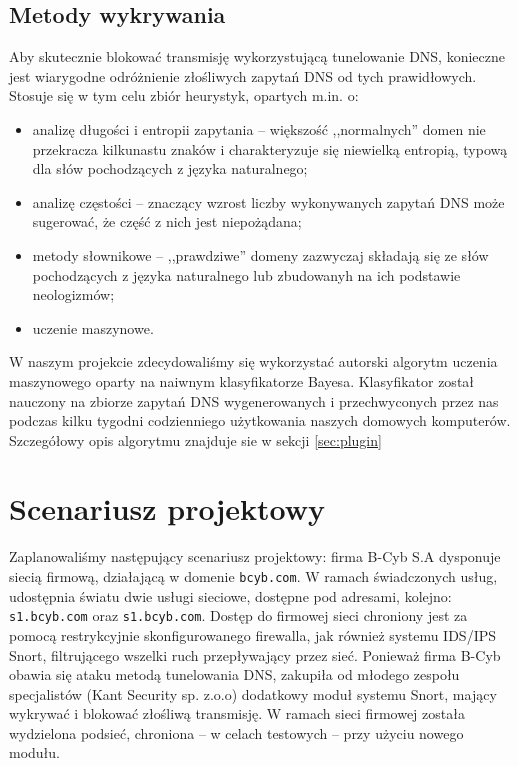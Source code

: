 \documentclass{eiti-raport}
\begin{document}
\subsection{Metody wykrywania}
Aby skutecznie blokować transmisję wykorzystującą tunelowanie DNS, konieczne jest wiarygodne odróżnienie złośliwych zapytań DNS od tych prawidłowych. Stosuje się w tym celu zbiór heurystyk, opartych m.in. o:
\begin{itemize}
	\item analizę długości i entropii zapytania -- większość ,,normalnych'' domen nie przekracza kilkunastu znaków i charakteryzuje się niewielką entropią, typową dla słów pochodzących z języka naturalnego;
	\item analizę częstości -- znaczący wzrost liczby wykonywanych zapytań DNS może sugerować, że część z nich jest niepożądana;
	\item metody słownikowe -- ,,prawdziwe'' domeny zazwyczaj składają się ze słów pochodzących z języka naturalnego lub zbudowanyh na ich podstawie neologizmów;
	\item uczenie maszynowe.
\end{itemize}
W naszym projekcie zdecydowaliśmy się wykorzystać autorski algorytm uczenia maszynowego oparty na naiwnym klasyfikatorze Bayesa. Klasyfikator został nauczony na zbiorze zapytań DNS wygenerowanych i przechwyconych przez nas podczas kilku tygodni codzienniego użytkowania naszych domowych komputerów. Szczegółowy opis algorytmu znajduje sie w sekcji \ref{sec:plugin} 

\section{Scenariusz projektowy}
Zaplanowaliśmy następujący scenariusz projektowy: firma B-Cyb S.A dysponuje siecią firmową, działającą w domenie \texttt{bcyb.com}. W ramach świadczonych usług, udostępnia światu dwie usługi sieciowe, dostępne pod adresami, kolejno: \texttt{s1.bcyb.com} oraz \texttt{s1.bcyb.com}. Dostęp do firmowej sieci chroniony jest za pomocą restrykcyjnie skonfigurowanego firewalla, jak również systemu IDS/IPS Snort, filtrującego wszelki ruch przepływający przez sieć. Ponieważ firma B-Cyb obawia się ataku metodą tunelowania DNS, zakupiła od młodego zespołu specjalistów (Kant Security sp. z.o.o) dodatkowy moduł systemu Snort, mający wykrywać i blokować złośliwą transmisję. W ramach sieci firmowej została wydzielona podsieć, chroniona -- w celach testowych -- przy użyciu nowego modułu. 
\end{document}
